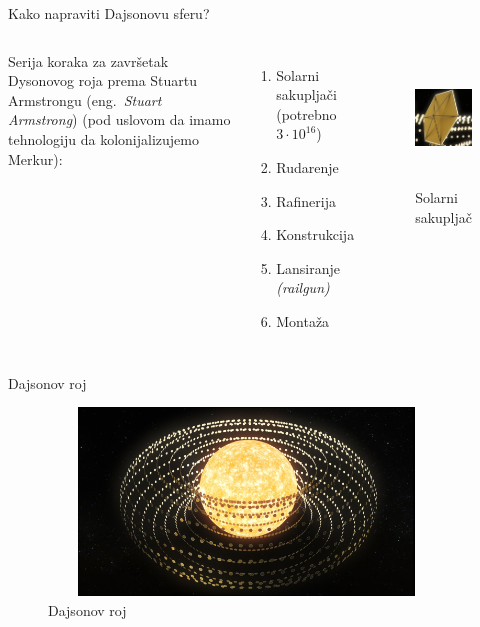\documentclass[13pt]{beamer}
\begin{document}
\begin{frame}{Kako napraviti Dajsonovu sferu?}

\begin{columns}
            Serija koraka za završetak Dysonovog roja prema Stuartu Armstrongu (eng.~{\em Stuart Armstrong}) (pod uslovom da imamo tehnologiju da kolonijalizujemo Merkur):
        \begin{enumerate}
            \item Solarni sakupljači (potrebno $3 \cdot 10^{16}$)
            \item Rudarenje
            \item Rafinerija
            \item Konstrukcija
            \item Lansiranje \textit{(railgun)}
            \item Montaža
        \end{enumerate}
        \begin{figure}
            \centering
            \includegraphics[width=4cm, height=3.5cm]{images/solarni kolektori.png}
            \caption{Solarni sakupljač}
            \label{fig:enter-label}
        \end{figure}
\end{columns}

\end{frame}

\begin{frame}{Dajsonov roj}

\begin{figure}
    \centering
    \includegraphics[width=10.5cm, height=5cm]{images/Dajsnonov_roj-2.png}
    \caption{Dajsonov roj}
\end{figure}
    
\end{frame}
\end{document}
